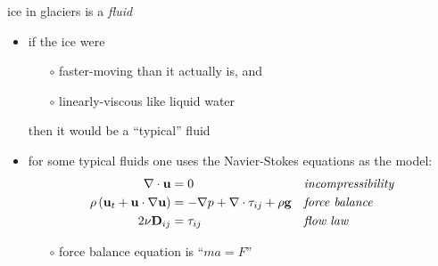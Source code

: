\begin{frame}{ice in glaciers is a \emph{fluid} }

\begin{itemize}
\item if the ice were
  \begin{itemize}
  \item[$\circ$] faster-moving than it actually is, and
  \item[$\circ$] linearly-viscous like liquid water
  \end{itemize}
  
  then it would be a ``typical'' fluid

\bigskip
\item for some typical fluids one uses the Navier-Stokes equations as the model:
\begin{align*}
\nabla \cdot \mathbf{u} &= 0 &&\text{\emph{incompressibility}} \\
\rho \left(\mathbf{u}_t + \mathbf{u}\cdot\nabla \mathbf{u}\right) &= -\nabla p + \nabla \cdot \tau_{ij} + \rho \mathbf{g} &&\text{\emph{force balance}} \\
2 \nu \mathbf{D}_{ij} &= \tau_{ij} &&\text{\emph{flow law}}
\end{align*}

\medskip
    \begin{itemize}
    \item[$\circ$] force balance equation is ``$m a = F$''    
    \end{itemize}
\end{itemize}
\end{frame}


